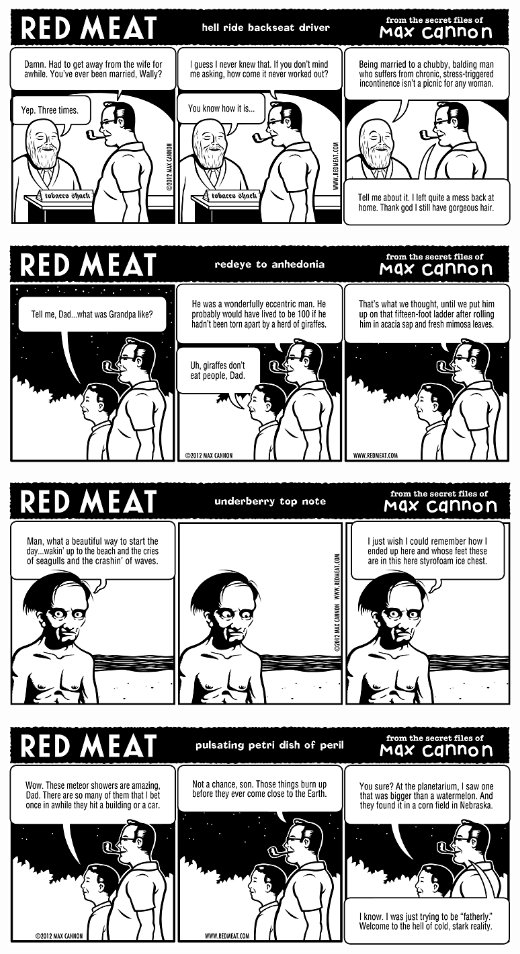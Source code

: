 \documentclass[a4paper,twoside,11pt]{article}
\begin{document}
\includegraphics[width=\textwidth]{redmeat_2012-08-21.png}



\includegraphics[width=\textwidth]{redmeat_2012-08-28.png}



\includegraphics[width=\textwidth]{redmeat_2012-09-04.png}



\includegraphics[width=\textwidth]{redmeat_2012-09-11.png}
\end{document}
